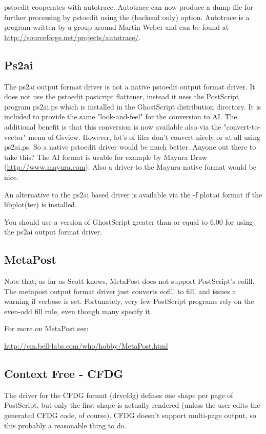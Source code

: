 \documentclass[english,a4paper]{article}
\let\URL\url \let\Email\url \let\File\url
\begin{document}
	pstoedit cooperates with autotrace. Autotrace can now produce a dump file 
	for further processing by pstoedit using the  (backend only) option. 
	Autotrace is a program written by a group around Martin Weber and can be 
	found at \URL{http://sourceforge.net/projects/autotrace/}.

  \subsection{Ps2ai}

    The ps2ai output format driver is not a native pstoedit output format driver. It does not use the
    pstoedit postcript flattener, instead it uses the PostScript program
    ps2ai.ps which is installed in the GhostScript distribution directory. It
    is included  to provide the same "look-and-feel" for the conversion to AI.
    The additional benefit is that this conversion is now available also via
    the "convert-to-vector" menu of Gsview. However, lot's of files don't
    convert nicely or at all using ps2ai.ps. So a native pstoedit driver would
    be much better. Anyone out there to take this? The AI format is usable for
    example by Mayura Draw (\URL{http://www.mayura.com}). Also a driver to the
    Mayura native format would be nice. 

    An alternative to the ps2ai based driver is available via the -f plot:ai format if the libplot(ter) is installed.

    You should use a version of GhostScript greater than or equal to 6.00 for using the ps2ai output format driver.


  \subsection{MetaPost}

    Note that, as far as Scott knows, MetaPost does not support PostScript's
    eofill. The metapost output format driver just converts eofill to fill, and issues a warning if
    verbose is set. Fortunately, very few PostScript programs rely on the
    even-odd fill rule, even though many specify it.

    For more on MetaPost see: 
    
    \URL{http://cm.bell-labs.com/who/hobby/MetaPost.html}

  \subsection{Context Free - CFDG} 
	The driver for the CFDG format (drvcfdg) defines
	one shape per page of PostScript, but only the first shape is actually
	rendered (unless the user edits the generated CFDG code, of course).
	CFDG doesn't support multi-page output, so this probably a reasonable thing to do.
 
\end{document}
